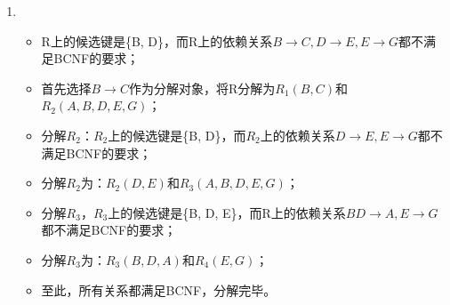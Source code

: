 \begin{enumerate}
	\item 
	\begin{itemize}
		\item R上的候选键是\{B, D\}，而R上的依赖关系$B \to C, D \to E, E \to G$都不满足BCNF的要求；
		\item 首先选择$B \to C$作为分解对象，将R分解为$R_{1}(B, C)$和$R_{2}(A, B, D, E, G)$；
		\item 分解$R_{2}$：$R_{2}$上的候选键是\{B, D\}，而$R_{2}$上的依赖关系$D \to E, E \to G$都不满足BCNF的要求；
		\item 分解$R_{2}$为：$R_{2}(D, E)$和$R_{3}(A, B, D, E, G)$；
		\item 分解$R_{3}$，$R_{3}$上的候选键是\{B, D, E\}，而R上的依赖关系$BD \to A, E \to G$都不满足BCNF的要求；
		\item 分解$R_{3}$为：$R_{3}(B, D, A)$和$R_{4}(E, G)$；
		\item 至此，所有关系都满足BCNF，分解完毕。
	\end{itemize}
\end{enumerate}
